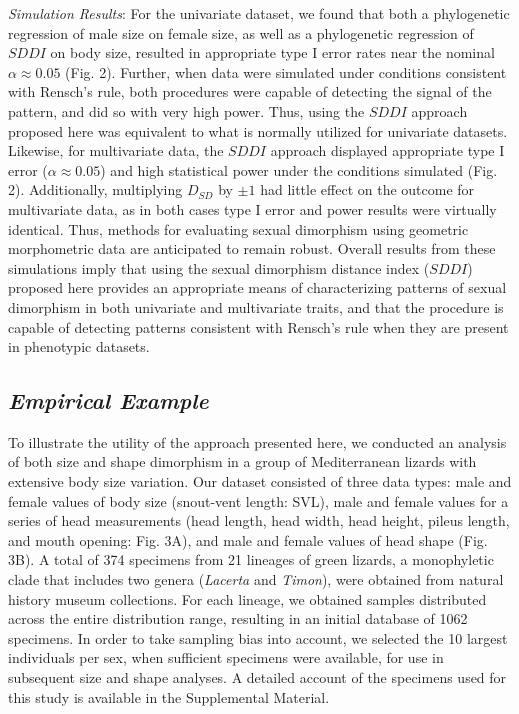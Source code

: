 \documentclass[]{article}
\begin{document}
\emph{Simulation Results}: For the univariate dataset, we found that
both a phylogenetic regression of male size on female size, as well as a
phylogenetic regression of \(SDDI\) on body size, resulted in
appropriate type I error rates near the nominal \(\alpha\approx0.05\)
(Fig. 2). Further, when data were simulated under conditions consistent
with Rensch's rule, both procedures were capable of detecting the signal
of the pattern, and did so with very high power. Thus, using the
\(SDDI\) approach proposed here was equivalent to what is normally
utilized for univariate datasets. Likewise, for multivariate data, the
\(SDDI\) approach displayed appropriate type I error
(\(\alpha\approx0.05\)) and high statistical power under the conditions
simulated (Fig. 2). Additionally, multiplying \(D_{SD}\) by \(\pm1\) had
little effect on the outcome for multivariate data, as in both cases
type I error and power results were virtually identical. Thus, methods
for evaluating sexual dimorphism using geometric morphometric data are
anticipated to remain robust. Overall results from these simulations
imply that using the sexual dimorphism distance index (\(SDDI\))
proposed here provides an appropriate means of characterizing patterns
of sexual dimorphism in both univariate and multivariate traits, and
that the procedure is capable of detecting patterns consistent with
Rensch's rule when they are present in phenotypic datasets. \hfill\break

\subsection{\texorpdfstring{\emph{Empirical
Example}}{Empirical Example}}\label{empirical-example}

To illustrate the utility of the approach presented here, we conducted
an analysis of both size and shape dimorphism in a group of
Mediterranean lizards with extensive body size variation. Our dataset
consisted of three data types: male and female values of body size
(snout-vent length: SVL), male and female values for a series of head
measurements (head length, head width, head height, pileus length, and
mouth opening: Fig. 3A), and male and female values of head shape (Fig.
3B). A total of 374 specimens from 21 lineages of green lizards, a
monophyletic clade that includes two genera (\emph{Lacerta} and
\emph{Timon}), were obtained from natural history museum collections.
For each lineage, we obtained samples distributed across the entire
distribution range, resulting in an initial database of 1062 specimens.
In order to take sampling bias into account, we selected the 10 largest
individuals per sex, when sufficient specimens were available, for use
in subsequent size and shape analyses. A detailed account of the
specimens used for this study is available in the Supplemental Material.
\hfill\break
\end{document}
